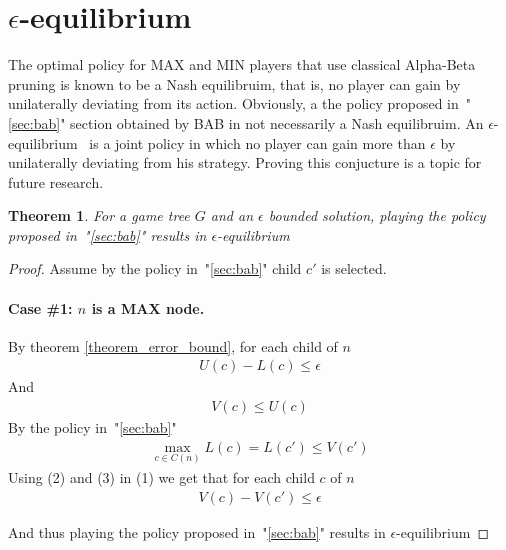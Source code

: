 \documentclass[letterpaper]{article} %
\newcounter{bab}
\newtheorem{theorem}{Theorem}
\newcommand{\MM}{\mathit{V}}
\newcommand{\pess}{\mathit{L}}
\newcommand{\opti}{\mathit{U}}
\begin{document}
\section{$\epsilon$-equilibrium} 
The optimal policy for MAX and MIN players that use classical Alpha-Beta pruning is known to be a Nash equilibruim, that is, no player can gain by unilaterally deviating from its action. Obviously, a the policy proposed in~"\ref{sec:bab}" section obtained by BAB in not necessarily a Nash equilibruim. An  $\epsilon$-equilibrium~\cite{nisan2007algorithmic} is a joint policy in which no player can gain more than $\epsilon$ by unilaterally deviating from his strategy. Proving this conjucture is a topic for future research. 

\begin{theorem}
For a game tree $G$ and an $\epsilon$ bounded solution, playing the policy proposed in~"\ref{sec:bab}" results in $\epsilon$-equilibrium
\end{theorem}
\begin{proof}

Assume by the policy in~"\ref{sec:bab}" child $c'$ is selected.

\paragraph{Case \#1: $n$ is a MAX node.} 
By theorem \ref{theorem_error_bound}, for each child of $n$
\begin{align}
    \opti(c) - \pess(c) \leq \epsilon
\end{align}
And
\begin{align}
   \MM(c) \leq \opti(c)
\end{align}
By the policy in~"\ref{sec:bab}"
\begin{align}
    \max\limits_{c\in C(n)} \pess(c) =  L(c') \leq \MM(c')
\end{align}
Using (2) and (3) in (1) we get that for each child $c$ of $n$
\begin{align}
    \MM(c) - \MM(c') \leq \epsilon
\end{align}

And thus playing the policy proposed in~"\ref{sec:bab}" results in $\epsilon$-equilibrium
\end{proof}
\end{document}

